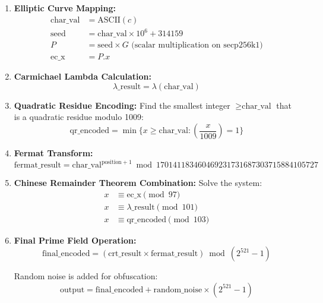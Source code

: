\documentclass[11pt,a4paper]{article}
\begin{document}
\begin{enumerate}
    \item \textbf{Elliptic Curve Mapping:}
    \begin{align}
    \text{char\_val} &= \text{ASCII}(c) \\
    \text{seed} &= \text{char\_val} \times 10^6 + 314159 \\
    P &= \text{seed} \times G \text{ (scalar multiplication on secp256k1)} \\
    \text{ec\_x} &= P.x
    \end{align}

    \item \textbf{Carmichael Lambda Calculation:}
    \begin{equation}
    \lambda\_\text{result} = \lambda(\text{char\_val})
    \end{equation}

    \item \textbf{Quadratic Residue Encoding:}
    Find the smallest integer $\geq \text{char\_val}$ that is a quadratic residue modulo 1009:
    \begin{equation}
    \text{qr\_encoded} = \min\{x \geq \text{char\_val} : \left(\frac{x}{1009}\right) = 1\}
    \end{equation}

    \item \textbf{Fermat Transform:}
    \begin{equation}
    \text{fermat\_result} = \text{char\_val}^{\text{position}+1} \bmod 170141183460469231731687303715884105727
    \end{equation}

    \item \textbf{Chinese Remainder Theorem Combination:}
    Solve the system:
    \begin{align}
    x &\equiv \text{ec\_x} \pmod{97} \\
    x &\equiv \lambda\_\text{result} \pmod{101} \\
    x &\equiv \text{qr\_encoded} \pmod{103}
    \end{align}

    \item \textbf{Final Prime Field Operation:}
    \begin{equation}
    \text{final\_encoded} = (\text{crt\_result} \times \text{fermat\_result}) \bmod (2^{521} - 1)
    \end{equation}
    
    Random noise is added for obfuscation:
    \begin{equation}
    \text{output} = \text{final\_encoded} + \text{random\_noise} \times (2^{521} - 1)
    \end{equation}
\end{enumerate}
\end{document}
